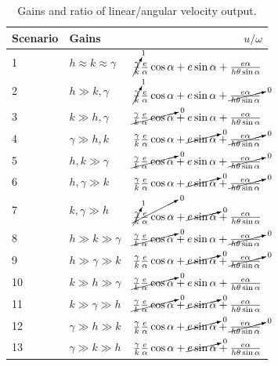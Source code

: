 \documentclass[12pt]{article}
\begin{document}
\begin{table}[ht!]
\caption{Gains and ratio of linear/angular velocity output.}
\small
\centering
\begin{tabular}{@{}llr@{}} \toprule
Scenario & Gains                     & $u/\omega$                                                                                        \\ \midrule
1        & $h\approx k\approx\gamma$ & $\cancelto{1}{\tfrac{\gamma}{k}}\tfrac{e}{\alpha}\cos\alpha + e\sin\alpha + \tfrac{e\alpha}{h\theta\sin\alpha}$ \\
2        & $h\gg k,\gamma$           & $\cancelto{1}{\tfrac{\gamma}{k}}\tfrac{e}{\alpha}\cos\alpha + e\sin\alpha + \cancelto{0}{\tfrac{e\alpha}{h\theta\sin\alpha}}$ \\
3        & $k\gg h,\gamma$           & $\cancelto{0}{\tfrac{\gamma}{k}\tfrac{e}{\alpha}\cos\alpha} + e\sin\alpha + \tfrac{e\alpha}{h\theta\sin\alpha}$ \\
4        & $\gamma\gg h,k$           & $\tfrac{\gamma}{k}\tfrac{e}{\alpha}\cos\alpha + \cancelto{0}{e\sin\alpha} + \cancelto{0}{\tfrac{e\alpha}{h\theta\sin\alpha}}$ \\
5        & $h,k \gg\gamma$           & $\cancelto{0}{\tfrac{\gamma}{k}\tfrac{e}{\alpha}\cos\alpha} + e\sin\alpha + \cancelto{0}{\tfrac{e\alpha}{h\theta\sin\alpha}}$ \\
6        & $h,\gamma\gg k$           & $\tfrac{\gamma}{k}\tfrac{e}{\alpha}\cos\alpha + \cancelto{0}{e\sin\alpha} + \cancelto{0}{\tfrac{e\alpha}{h\theta\sin\alpha}}$ \\
7        & $k,\gamma\gg h$           & $\cancelto{0}{\cancelto{1}{\tfrac{\gamma}{k}}\tfrac{e}{\alpha}\cos\alpha} + \cancelto{0}{e\sin\alpha} + \tfrac{e\alpha}{h\theta\sin\alpha}$ \\
8        & $h\gg k\gg\gamma$         & $\cancelto{0}{\tfrac{\gamma}{k}\tfrac{e}{\alpha}\cos\alpha} + e\sin\alpha + \cancelto{0}{\tfrac{e\alpha}{h\theta\sin\alpha}}$ \\
9        & $h\gg\gamma\gg k$         & $\tfrac{\gamma}{k}\tfrac{e}{\alpha}\cos\alpha + \cancelto{0}{e\sin\alpha} + \cancelto{0}{\tfrac{e\alpha}{h\theta\sin\alpha}}$ \\
10       & $k\gg h\gg\gamma$         & $\cancelto{0}{\tfrac{\gamma}{k}\tfrac{e}{\alpha}\cos\alpha} + e\sin\alpha + \tfrac{e\alpha}{h\theta\sin\alpha}$ \\
11       & $k\gg\gamma\gg h$         & $\cancelto{0}{\tfrac{\gamma}{k}\tfrac{e}{\alpha}\cos\alpha} + \cancelto{0}{e\sin\alpha} + \tfrac{e\alpha}{h\theta\sin\alpha}$ \\
12       & $\gamma\gg h\gg k$        & $\tfrac{\gamma}{k}\tfrac{e}{\alpha}\cos\alpha + \cancelto{0}{e\sin\alpha} + \cancelto{0}{\tfrac{e\alpha}{h\theta\sin\alpha}}$ \\
13       & $\gamma\gg k\gg h$        & $\tfrac{\gamma}{k}\tfrac{e}{\alpha}\cos\alpha + \cancelto{0}{e\sin\alpha} + \tfrac{e\alpha}{h\theta\sin\alpha}$ \\ \bottomrule
\end{tabular}
\label{tab:gainsLinAngVelRelation}
\end{table}
\end{document}
